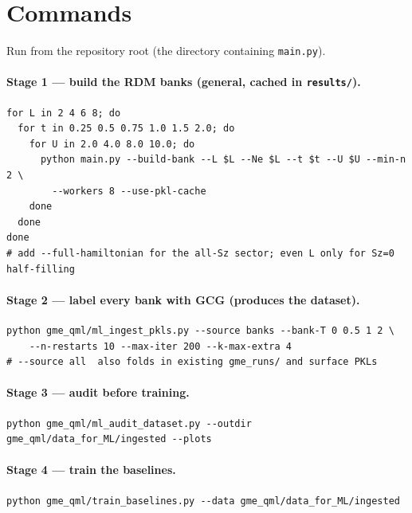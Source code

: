 \documentclass[11pt]{article}
\newcommand{\code}[1]{\texttt{\small #1}}
\begin{document}
\section{Commands}\label{sec:commands}
Run from the repository root (the directory containing \code{main.py}).

\paragraph{Stage 1 --- build the RDM banks (general, cached in \code{results/}).}
\begin{Verbatim}[fontsize=\small]
for L in 2 4 6 8; do
  for t in 0.25 0.5 0.75 1.0 1.5 2.0; do
    for U in 2.0 4.0 8.0 10.0; do
      python main.py --build-bank --L $L --Ne $L --t $t --U $U --min-n 2 \
        --workers 8 --use-pkl-cache
    done
  done
done
# add --full-hamiltonian for the all-Sz sector; even L only for Sz=0 half-filling
\end{Verbatim}

\paragraph{Stage 2 --- label every bank with GCG (produces the dataset).}
\begin{Verbatim}[fontsize=\small]
python gme_qml/ml_ingest_pkls.py --source banks --bank-T 0 0.5 1 2 \
    --n-restarts 10 --max-iter 200 --k-max-extra 4
# --source all  also folds in existing gme_runs/ and surface PKLs
\end{Verbatim}

\paragraph{Stage 3 --- audit before training.}
\begin{Verbatim}[fontsize=\small]
python gme_qml/ml_audit_dataset.py --outdir gme_qml/data_for_ML/ingested --plots
\end{Verbatim}

\paragraph{Stage 4 --- train the baselines.}
\begin{Verbatim}[fontsize=\small]
python gme_qml/train_baselines.py --data gme_qml/data_for_ML/ingested
\end{Verbatim}
\end{document}
